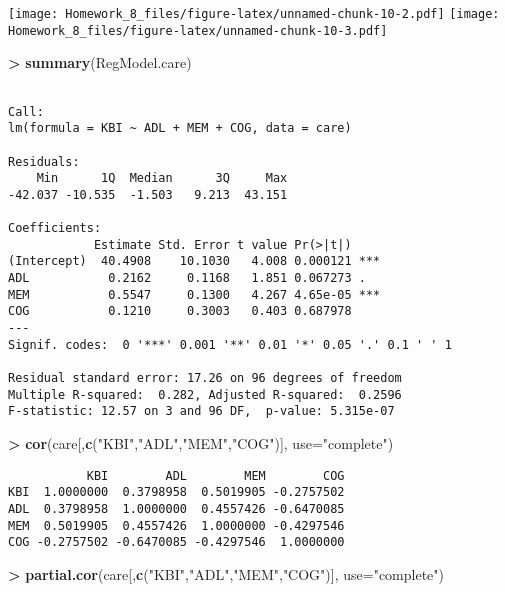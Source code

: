 \documentclass[]{article}
\newenvironment{Shaded}{\begin{snugshade}}{\end{snugshade}}
\newcommand{\KeywordTok}[1]{\textcolor[rgb]{0.13,0.29,0.53}{\textbf{#1}}}
\newcommand{\DataTypeTok}[1]{\textcolor[rgb]{0.13,0.29,0.53}{#1}}
\newcommand{\StringTok}[1]{\textcolor[rgb]{0.31,0.60,0.02}{#1}}
\newcommand{\OperatorTok}[1]{\textcolor[rgb]{0.81,0.36,0.00}{\textbf{#1}}}
\newcommand{\NormalTok}[1]{#1}
\begin{document}
\texttt{[image: Homework\_8\_files/figure-latex/unnamed-chunk-10-2.pdf]}
\texttt{[image: Homework\_8\_files/figure-latex/unnamed-chunk-10-3.pdf]}

\begin{Shaded}
\begin{Highlighting}[]
\OperatorTok{>}\StringTok{ }\KeywordTok{summary}\NormalTok{(RegModel.care)}
\end{Highlighting}
\end{Shaded}

\begin{verbatim}

Call:
lm(formula = KBI ~ ADL + MEM + COG, data = care)

Residuals:
    Min      1Q  Median      3Q     Max 
-42.037 -10.535  -1.503   9.213  43.151 

Coefficients:
            Estimate Std. Error t value Pr(>|t|)    
(Intercept)  40.4908    10.1030   4.008 0.000121 ***
ADL           0.2162     0.1168   1.851 0.067273 .  
MEM           0.5547     0.1300   4.267 4.65e-05 ***
COG           0.1210     0.3003   0.403 0.687978    
---
Signif. codes:  0 '***' 0.001 '**' 0.01 '*' 0.05 '.' 0.1 ' ' 1

Residual standard error: 17.26 on 96 degrees of freedom
Multiple R-squared:  0.282, Adjusted R-squared:  0.2596 
F-statistic: 12.57 on 3 and 96 DF,  p-value: 5.315e-07
\end{verbatim}

\begin{Shaded}
\begin{Highlighting}[]
\OperatorTok{>}\StringTok{ }\KeywordTok{cor}\NormalTok{(care[,}\KeywordTok{c}\NormalTok{(}\StringTok{"KBI"}\NormalTok{,}\StringTok{"ADL"}\NormalTok{,}\StringTok{"MEM"}\NormalTok{,}\StringTok{"COG"}\NormalTok{)], }\DataTypeTok{use=}\StringTok{"complete"}\NormalTok{)}
\end{Highlighting}
\end{Shaded}

\begin{verbatim}
           KBI        ADL        MEM        COG
KBI  1.0000000  0.3798958  0.5019905 -0.2757502
ADL  0.3798958  1.0000000  0.4557426 -0.6470085
MEM  0.5019905  0.4557426  1.0000000 -0.4297546
COG -0.2757502 -0.6470085 -0.4297546  1.0000000
\end{verbatim}

\begin{Shaded}
\begin{Highlighting}[]
\OperatorTok{>}\StringTok{ }\KeywordTok{partial.cor}\NormalTok{(care[,}\KeywordTok{c}\NormalTok{(}\StringTok{"KBI"}\NormalTok{,}\StringTok{"ADL"}\NormalTok{,}\StringTok{"MEM"}\NormalTok{,}\StringTok{"COG"}\NormalTok{)], }\DataTypeTok{use=}\StringTok{"complete"}\NormalTok{)}
\end{Highlighting}
\end{Shaded}
\end{document}
